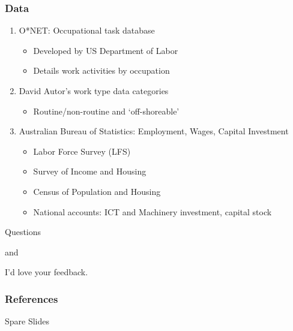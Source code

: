 \documentclass[red]{beamer}
\begin{document}
\begin{frame}
  \frametitle{Data}
  \begin{enumerate}
  \item O*NET: Occupational task database
    \begin{itemize}
    \item Developed by US Department of Labor
    \item Details work activities by occupation
    \end{itemize}
    \vspace{10pt}
  \item David Autor's work type data categories
    \begin{itemize}
    \item Routine/non-routine and `off-shoreable'
    \end{itemize}
    \vspace{10pt}
  \item Australian Bureau of Statistics: Employment, Wages, Capital Investment
    \begin{itemize}
    \item Labor Force Survey (LFS)
    \item Survey of Income and Housing
    \item Census of Population and Housing
    \item National accounts: ICT and Machinery investment, capital stock
    \end{itemize}
  \end{enumerate}
\end{frame}

\begin{frame}
  \begin{center}
    Questions
    \vspace{1cm}

    and
    \vspace{1cm}

    I'd love your feedback.
  \end{center}
\end{frame}

\begin{frame}
\frametitle{References}
\printbibliography
\end{frame}

\begin{frame}
  \begin{center}
    Spare Slides
  \end{center}
\end{frame}
\end{document}
